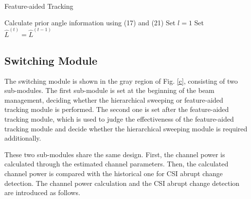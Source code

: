 \documentclass[journal,12pt,onecolumn,draftclsnofoot,]{IEEEtran}
\begin{document}
\begin{algorithm}[t]
\caption{{\color{black}Feature-aided Tracking}}\label{A2}
Calculate prior angle information {\color{black}using} (17) and (21)\;
Set $l = 1$\;
Set {${\hat L}^{(t )}= {\hat L}^{(t-1)}$}\;
\end{algorithm}



\vspace{-2.5mm}
\subsection{Switching Module}
The switching module is shown in the gray region of Fig. \ref{c}, consisting of two sub-modules. 
The first sub-module is set at the beginning of the beam management, deciding whether the hierarchical sweeping or feature-aided tracking module is performed.
The second one is set after the feature-aided tracking module, which is used to judge the effectiveness of the feature-aided tracking module and decide whether the hierarchical sweeping module is required additionally. 

These two sub-modules share the same design. First, the channel power is calculated through the estimated channel parameters. Then, the calculated channel power is compared with the historical one for CSI abrupt change detection. 
The channel power calculation and the CSI abrupt change detection are introduced as follows. 
\end{document}
